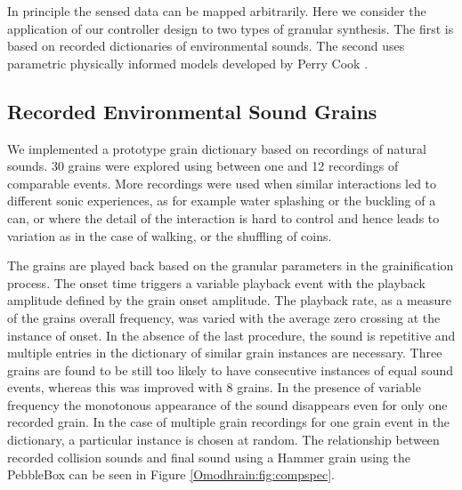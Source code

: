In principle the sensed data can be mapped arbitrarily. Here we
consider the application of our controller design to two types of granular synthesis. The first is
based on recorded dictionaries of environmental sounds. The second
uses parametric physically informed models developed by Perry Cook
 \cite{Cook:1997,Cook:1999b,Cook:2002}. 

\subsection{Recorded Environmental Sound Grains}

We implemented a prototype grain dictionary based on recordings of
natural sounds. 30 grains were explored using between one and 12
recordings of comparable events. More recordings were used when similar
interactions led to different sonic experiences, as for example water
splashing or the buckling of a can, or where the detail of the
interaction is hard to control and hence leads to variation as in the
case of walking, or the shuffling of coins.

The grains are played back based on the granular parameters in the
grainification process. The onset time triggers a variable playback
event with the playback amplitude defined by the grain onset
amplitude. The playback rate, as a measure of the grains overall
frequency, was varied with the average zero crossing at the instance
of onset. In the absence of the last procedure, the sound is
repetitive and multiple entries in the dictionary of similar grain
instances are necessary. Three grains are found to be still too likely
to have consecutive instances of equal sound events, whereas this was
improved with 8 grains. In the presence of variable frequency the
monotonous appearance of the sound disappears even for only one
recorded grain. In the case of multiple grain recordings for one grain
event in the dictionary, a particular instance is chosen at
random. The relationship between recorded collision sounds and final
sound using a Hammer grain using the PebbleBox can be seen in Figure
\ref{Omodhrain:fig:compspec}.

